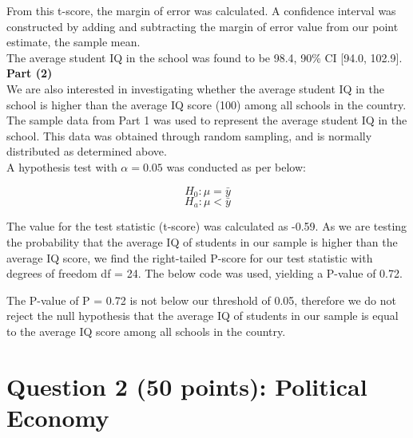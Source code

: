 \documentclass[12pt,letterpaper]{article}
\begin{document}
  

\vspace{.5cm}

From this t-score, the margin of error was calculated. A confidence interval was constructed by adding and subtracting the margin of error value from our point estimate, the sample mean.\\

The average student IQ in the school was found to be 98.4, 90\% CI [94.0, 102.9].\\ 

\noindent \textbf{Part (2)}\\

We are also interested in investigating whether the average student IQ in the school is higher than the average IQ score (100) among all schools in the country.\\
	
The sample data from Part 1 was used to represent the average student IQ in the school. This data was obtained through random sampling, and is normally distributed as determined above.\\

A hypothesis test with $\alpha=0.05$ was conducted as per below:

\[ H_0 : \mu = \bar y\]
\[ H_a : \mu < \bar y\]

The value for the test statistic (t-score) was calculated as -0.59. As we are testing the probability that the average IQ of students in our sample is higher than the average IQ score, we find the right-tailed P-score for our test statistic with degrees of freedom df = 24. The below code was used, yielding a P-value of 0.72.

\vspace{.5cm}

  

\vspace{.5cm}

The P-value of P = 0.72 is not below our threshold of 0.05, therefore we do not reject the null hypothesis that the average IQ of students in our sample is equal to the average IQ score among all schools in the country. 

\newpage

	\section*{Question 2 (50 points): Political Economy}
\end{document}

